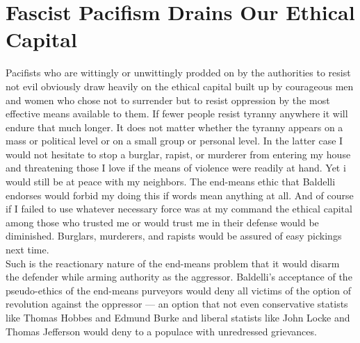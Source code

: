\section*{Fascist Pacifism Drains Our Ethical Capital}
         Pacifists who are wittingly or unwittingly prodded on by the authorities to resist not evil obviously draw heavily on the ethical capital built up by courageous men and women who chose not to surrender but to resist oppression by the most effective means available to them. If fewer people resist tyranny anywhere it will endure that much longer. It does not matter whether the tyranny appears on a mass or political level or on a small group or personal level. In the latter case I would not hesitate to stop a burglar, rapist, or murderer from entering my house and threatening those I love if the means of violence were readily at hand. Yet i would still be at peace with my neighbors. The end-means ethic that Baldelli endorses would forbid my doing this if words mean anything at all. And of course if I failed to use whatever necessary force was at my command the ethical capital among those who trusted me or would trust me in their defense would be diminished. Burglars, murderers, and rapists would be 
assured of easy pickings next time.\\
Such is the reactionary nature of the end-means problem that it would disarm the defender while arming authority as the aggressor. Baldelli's acceptance of the pseudo-ethics of the end-means purveyors would deny all victims of the option of revolution against the oppressor --- an option that not even conservative statists like Thomas Hobbes and Edmund Burke and liberal statists like John Locke and Thomas Jefferson would deny to a populace with unredressed grievances.

